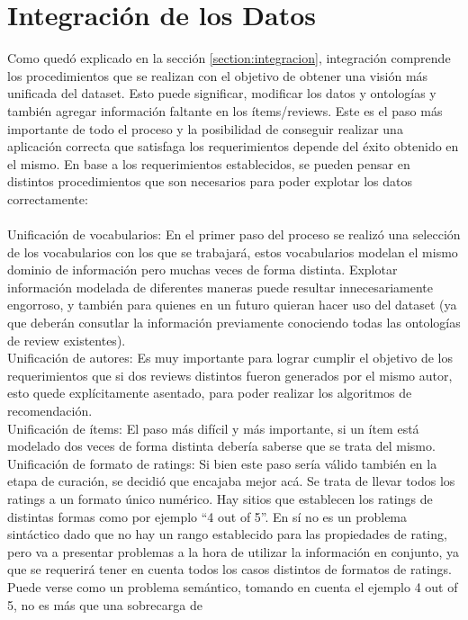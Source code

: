 \chapter{Integración de los Datos}
\label{chapter:integracion}

Como quedó explicado en la sección \ref{section:integracion}, integración comprende los procedimientos que se realizan con el objetivo de obtener una
visión más unificada del dataset.
Esto puede significar, modificar los datos y ontologías y también agregar información faltante en los ítems/reviews.
Este es el paso más importante de todo el proceso y la posibilidad de conseguir realizar una aplicación correcta que satisfaga los requerimientos
depende del éxito obtenido en el mismo.
En base a los requerimientos establecidos, se pueden pensar en distintos procedimientos que son necesarios para poder explotar los datos
correctamente:
\\
\\
Unificación de vocabularios: En el primer paso del proceso se realizó una selección de los vocabularios con los que se trabajará, 
estos vocabularios modelan el mismo dominio de información pero muchas veces de forma distinta. Explotar información modelada de 
diferentes maneras puede resultar innecesariamente engorroso, y también para quienes en un futuro quieran hacer uso del dataset (ya que
deberán consutlar la información previamente conociendo todas las ontologías de review existentes).\\
Unificación de autores: Es muy importante para lograr cumplir el objetivo de los requerimientos que si dos reviews distintos fueron 
generados por el mismo autor, esto quede explícitamente asentado, para poder realizar los algoritmos de recomendación.\\
Unificación de ítems: El paso más difícil y más importante, si un ítem está modelado dos veces de forma distinta debería saberse que 
se trata del mismo.\\
Unificación de formato de ratings: Si bien este paso sería válido también en la etapa de curación, se decidió que encajaba mejor acá.
Se trata de llevar todos los ratings a un formato único numérico. Hay sitios que establecen los ratings de distintas formas como 
por ejemplo ``4 out of 5''. En sí no es un problema sintáctico dado que no hay un rango establecido para las propiedades de rating, 
pero va a presentar problemas a la hora de utilizar la información en conjunto, ya que se requerirá tener en cuenta todos los casos 
distintos de formatos de ratings. Puede verse como un problema semántico, tomando en cuenta el ejemplo 4 out of 5, no es más que una sobrecarga de 
